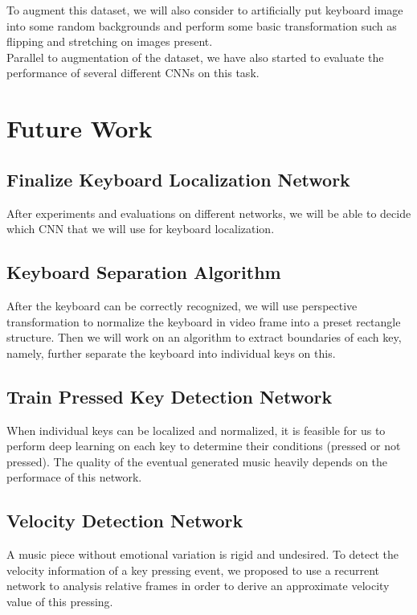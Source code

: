 \documentclass[10pt,twocolumn,letterpaper]{article}
\begin{document}
To augment this dataset, we will also consider to artificially put keyboard image into some random backgrounds and perform some basic transformation such as flipping and stretching on images present.\\

Parallel to augmentation of the dataset, we have also started to evaluate the performance of several different CNNs on this task.

\section{Future Work}

\subsection{Finalize Keyboard Localization Network}

After experiments and evaluations on different networks, we will be able to decide which CNN that we will use for keyboard localization.

\subsection{Keyboard Separation Algorithm}

After the keyboard can be correctly recognized, we will use perspective transformation to normalize the keyboard in video frame into a preset rectangle structure. Then we will work on an algorithm to extract boundaries of each key, namely, further separate the keyboard into individual keys on this.

\subsection{Train Pressed Key Detection Network}

When individual keys can be localized and normalized, it is feasible for us to perform deep learning on each key to determine their conditions (pressed or not pressed). The quality of the eventual generated music heavily depends on the performace of this network.

\subsection{Velocity Detection Network}

A music piece without emotional variation is rigid and undesired. To detect the velocity information of a key pressing event, we proposed to use a recurrent network to analysis relative frames in order to derive an approximate velocity value of this pressing.
\end{document}
